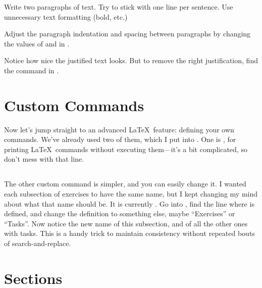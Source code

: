 \documentclass{article}
\begin{document}
Write two paragraphs of text.
Try to stick with one line per sentence.
Use unnecessary text formatting (bold, etc.)

Adjust the paragraph indentation and spacing between paragraphs by changing the values of \latexcode{\\parindent} and \latexcode{\\parskip} in .

Notice how nice the justified text looks.
But to remove the right justification, find the \latexcode{\\raggedright} command in .

\section{Custom Commands}
\label{sec:custom}

Now let's jump straight to an advanced \LaTeX\ feature: defining your own commands.
We've already used two of them, which I put into .
One is \latexcode{\\latexcode}, for printing \LaTeX\ commands without executing them---it's a bit complicated, so don't mess with that line.

\subsection{\task}

The other custom command is simpler, and you can easily change it.
I wanted each subsection of exercises to have the same name, but I kept changing my mind about what that name should be.
It is currently \task.
Go into , find the line where \latexcode{\\task} is defined, and change the definition to something else, maybe ``Exercises'' or ``Tasks''.
Now notice the new name of this subsection, and of all the other ones with tasks.
This is a handy trick to maintain consistency without repeated bouts of search-and-replace.

\section{Sections}
\label{sec:sections}
\end{document}
